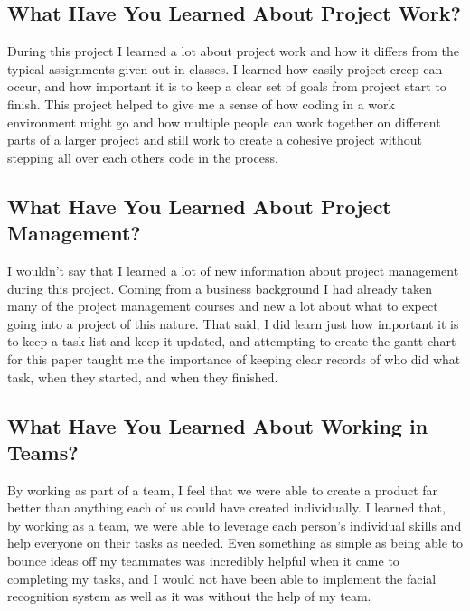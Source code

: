 \documentclass[10pt, onecolumn, twoside, peerreview]{IEEEtran}
\begin{document}
\subsection{What Have You Learned About Project Work?}
During this project I learned a lot about project work and how it differs from the typical assignments given out in classes. I learned how easily project creep can occur, and how important it is to keep a clear set of goals from project start to finish. This project helped to give me a sense of how coding in a work environment might go and how multiple people can work together on different parts of a larger project and still work to create a cohesive project without stepping all over each others code in the process.

\subsection{What Have You Learned About Project Management?}
I wouldn't say that I learned a lot of new information about project management during this project. Coming from a business background I had already taken many of the project management courses and new a lot about what to expect going into a project of this nature. That said, I did learn just how important it is to keep a task list and keep it updated, and attempting to create the gantt chart for this paper taught me the importance of keeping clear records of who did what task, when they started, and when they finished.

\subsection{What Have You Learned About Working in Teams?}
By working as part of a team, I feel that we were able to create a product far better than anything each of us could have created individually. I learned that, by working as a team, we were able to leverage each person's individual skills and help everyone on their tasks as needed. Even something as simple as being able to bounce ideas off my teammates was incredibly helpful when it came to completing my tasks, and I would not have been able to implement the facial recognition system as well as it was without the help of my team.
\end{document}
